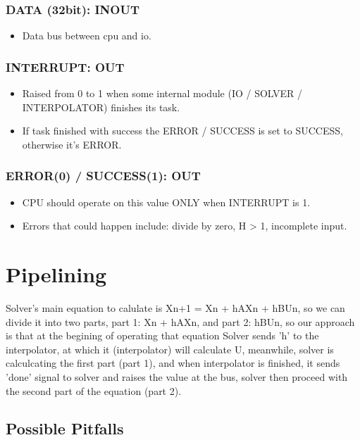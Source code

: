 \documentclass[12pt]{report}
\begin{document}
\subsubsection{DATA (32bit): INOUT}
\begin{itemize}
    \item Data bus between cpu and io.
\end{itemize}

\subsubsection{INTERRUPT: OUT}
\begin{itemize}
    \item Raised from 0 to 1 when some internal module (IO / SOLVER / INTERPOLATOR) finishes its task.
    \item If task finished with success the {ERROR / SUCCESS} is set to {SUCCESS}, otherwise it's {ERROR}.
\end{itemize}

\subsubsection{ERROR(0) / SUCCESS(1): OUT}
\begin{itemize}
    \item CPU should operate on this value ONLY when {INTERRUPT} is 1.
    \item Errors that could happen include: divide by zero, H > 1, incomplete input.
\end{itemize}

\section{Pipelining} 
\label{sec:pipeline}
Solver's main equation to calulate is Xn+1 = Xn + hAXn + hBUn, so we can divide it into two parts, 
part 1: Xn + hAXn, and part 2: hBUn, so our approach is that at the begining of operating that equation
Solver sends 'h' to the interpolator, at which it (interpolator) will calculate U, meanwhile, solver is calculcating the first part (part 1), and when interpolator is finished, it sends 'done' signal to solver and raises the value at the bus,
solver then proceed with the second part of the equation (part 2).

\subsection{Possible Pitfalls}
\end{document}
